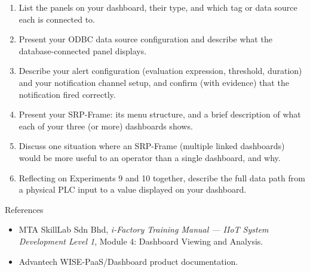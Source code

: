 \begin{reportq}
  \begin{enumerate}
    \item List the panels on your dashboard, their type, and which tag or data source each is connected to.
    \item Present your ODBC data source configuration and describe what the database-connected panel displays.
    \item Describe your alert configuration (evaluation expression, threshold, duration) and your notification channel setup, and confirm (with evidence) that the notification fired correctly.
    \item Present your SRP-Frame: its menu structure, and a brief description of what each of your three (or more) dashboards shows.
    \item Discuss one situation where an SRP-Frame (multiple linked dashboards) would be more useful to an operator than a single dashboard, and why.
    \item Reflecting on Experiments 9 and 10 together, describe the full data path from a physical PLC input to a value displayed on your dashboard.
  \end{enumerate}
\end{reportq}

\begin{labsection}{References}{}
  \begin{itemize}
    \item MTA SkillLab Sdn Bhd, \textit{i-Factory Training Manual --- IIoT System Development Level 1}, Module 4: Dashboard Viewing and Analysis.
    \item Advantech WISE-PaaS/Dashboard product documentation.
  \end{itemize}
\end{labsection}

